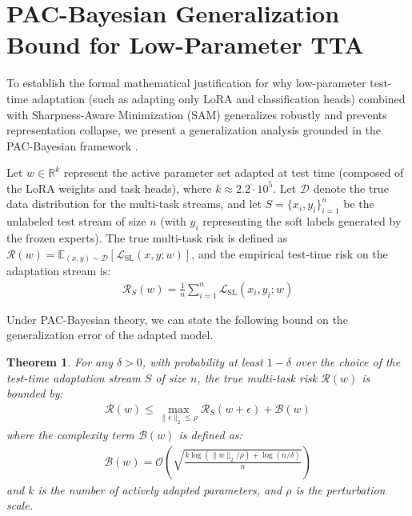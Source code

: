 \documentclass{article}
\theoremstyle{plain}
\newtheorem{theorem}{Theorem}[section]
\theoremstyle{definition}
\theoremstyle{remark}
\begin{document}
\newpage



\newpage
\appendix
\onecolumn
\section{PAC-Bayesian Generalization Bound for Low-Parameter TTA}
To establish the formal mathematical justification for why low-parameter test-time adaptation (such as adapting only LoRA and classification heads) combined with Sharpness-Aware Minimization (SAM) generalizes robustly and prevents representation collapse, we present a generalization analysis grounded in the PAC-Bayesian framework \cite{mcallester1999pac}.

Let $w \in \mathbb{R}^k$ represent the active parameter set adapted at test time (composed of the LoRA weights and task heads), where $k \approx 2.2 \cdot 10^5$. Let $\mathcal{D}$ denote the true data distribution for the multi-task streams, and let $S = \{x_i, y_i\}_{i=1}^n$ be the unlabeled test stream of size $n$ (with $y_i$ representing the soft labels generated by the frozen experts). The true multi-task risk is defined as $\mathcal{R}(w) = \mathbb{E}_{(x, y) \sim \mathcal{D}}[\mathcal{L}_{\text{SL}}(x, y; w)]$, and the empirical test-time risk on the adaptation stream is:
\begin{align}
    \mathcal{R}_S(w) = \frac{1}{n} \sum_{i=1}^n \mathcal{L}_{\text{SL}}(x_i, y_i; w)
\end{align}

Under PAC-Bayesian theory, we can state the following bound on the generalization error of the adapted model.

\begin{theorem}
For any $\delta > 0$, with probability at least $1 - \delta$ over the choice of the test-time adaptation stream $S$ of size $n$, the true multi-task risk $\mathcal{R}(w)$ is bounded by:
\begin{align}
    \mathcal{R}(w) \le \max_{\|\epsilon\|_2 \le \rho} \mathcal{R}_S(w + \epsilon) + \mathcal{B}(w)
\end{align}
where the complexity term $\mathcal{B}(w)$ is defined as:
\begin{align}
    \mathcal{B}(w) = \mathcal{O}\left( \sqrt{\frac{k \log(\|w\|_2 / \rho) + \log(n/\delta)}{n}} \right)
\end{align}
and $k$ is the number of actively adapted parameters, and $\rho$ is the perturbation scale.
\end{theorem}
\end{document}
